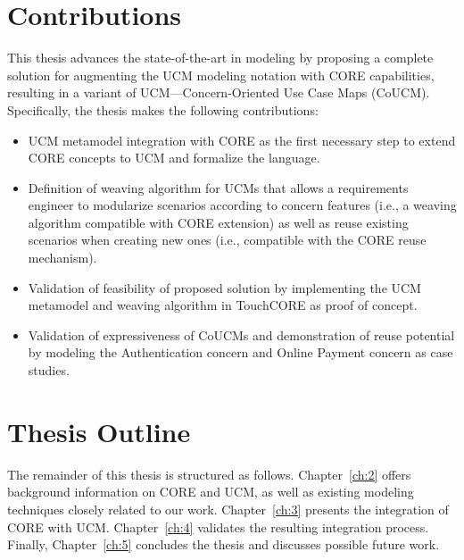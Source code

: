 \section{Contributions}

This thesis advances the state-of-the-art in modeling by proposing a complete solution for augmenting the UCM modeling notation with CORE capabilities, resulting in a variant of UCM---Concern-Oriented Use Case Maps (CoUCM). Specifically, the thesis makes the following contributions:

\begin{itemize}

\item UCM metamodel integration with CORE as the first necessary step to extend CORE concepts to UCM and formalize the language.

\item Definition of weaving algorithm for UCMs that allows a requirements engineer to modularize scenarios according to concern features (i.e., a weaving algorithm compatible with CORE extension) as well as reuse existing scenarios when creating new ones (i.e., compatible with the CORE reuse mechanism).

\item Validation of feasibility of proposed solution by implementing the UCM metamodel and weaving algorithm in TouchCORE as proof of concept.

\item Validation of expressiveness of CoUCMs and demonstration of reuse potential by modeling the Authentication concern and Online Payment concern as case studies.

\end{itemize}

\section{Thesis Outline}

The remainder of this thesis is structured as follows. Chapter~\ref{ch:2} offers background information on CORE and UCM, as well as existing modeling techniques closely related to our work. Chapter~\ref{ch:3} presents the integration of CORE with UCM. Chapter~\ref{ch:4} validates the resulting integration process. Finally, Chapter~\ref{ch:5} concludes the thesis and discusses possible future work.
